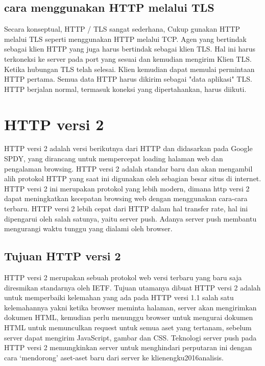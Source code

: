 \subsection{cara menggunakan HTTP melalui TLS}
Secara konseptual, HTTP / TLS sangat sederhana, Cukup gunakan HTTP melalui TLS seperti menggunakan HTTP melalui TCP. Agen yang bertindak sebagai klien HTTP yang juga harus bertindak sebagai klien TLS. Hal ini harus terkoneksi ke server pada port yang sesuai dan kemudian mengirim Klien TLS. Ketika hubungan TLS telah selesai. Klien kemudian dapat memulai permintaan HTTP pertama. Semua data HTTP harus dikirim sebagai "data aplikasi" TLS. HTTP berjalan normal, termasuk koneksi yang dipertahankan, harus diikuti\cite{rescorla2000http}.

\section{HTTP versi 2}
HTTP versi 2 adalah versi berikutnya dari HTTP dan didasarkan pada Google SPDY, yang dirancang untuk mempercepat loading halaman web dan pengalaman browsing. HTTP versi 2 adalah standar baru dan akan mengambil alih protokol HTTP yang saat ini digunakan oleh sebagian besar situs di internet. HTTP versi 2 ini merupakan protokol yang lebih modern, dimana http versi 2 dapat meningkatkan kecepatan browsing web dengan menggunakan cara-cara terbaru. HTTP versi 2 lebih cepat dari HTTP dalam hal transfer rate, hal ini dipengarui oleh salah satunya, yaitu server push. Adanya server push membantu mengurangi waktu tunggu yang dialami oleh browser\cite{engku2016analisis}.

\subsection{Tujuan HTTP versi 2}
HTTP versi 2 merupakan sebuah protokol web versi terbaru yang baru saja diresmikan standarnya oleh IETF. Tujuan utamanya dibuat HTTP versi 2 adalah untuk memperbaiki kelemahan yang ada pada HTTP versi 1.1 salah satu kelemahannya yakni ketika browser meminta halaman, server akan mengirimkan dokumen HTML, kemudian perlu menunggu browser untuk mengurai dokumen HTML untuk memunculkan request untuk semua aset yang tertanam, sebelum server dapat mengirim JavaScript, gambar dan CSS. Teknologi server push pada HTTP versi 2 memungkinkan server untuk menghindari perputaran ini dengan cara `mendorong' aset-aset baru dari server ke klien{engku2016analisis}.